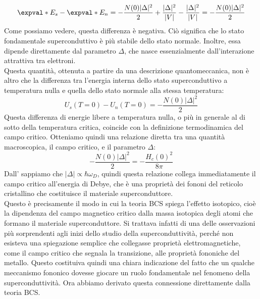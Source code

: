 \begin{equation*}
   \expval*{E}_s - \expval*{E}_n
   =
   -\frac{N(0)|\Delta|^2}{2}
   +
   \frac{|\Delta|^2}{|V|}
   -
   \frac{|\Delta|^2}{|V|}
   =
   -\frac{N(0)|\Delta|^2}{2}
\end{equation*}
Come possiamo vedere, questa differenza è negativa. Ciò significa che lo stato fondamentale superconduttivo è più stabile dello stato normale. Inoltre, essa dipende direttamente dal parametro $\Delta$, che nasce essenzialmente dall'interazione attrattiva tra elettroni.\\
Questa quantità, ottenuta a partire da una descrizione quantomeccanica, non è altro che la differenza tra l'energia interna dello stato superconduttivo a temperatura nulla e quella dello stato normale alla stessa temperatura:
\begin{equation*}
   U_s(T=0)-U_n(T=0)=-\frac{N(0)|\Delta|^2}{2}
\end{equation*}
Questa differenza di energie libere a temperatura nulla, o più in generale al di sotto della temperatura critica, coincide con la definizione termodinamica del campo critico. Otteniamo quindi una relazione diretta tra una quantità macroscopica, il campo critico, e il parametro $\Delta$:
\begin{equation*}
   -\frac{N(0)|\Delta|^2}{2}
   =
   -\frac{H_c(0)^2}{8\pi}
\end{equation*}
Dall' sappiamo che $|\Delta| \propto \hbar \omega_D$, quindi questa relazione collega immediatamente il campo critico all'energia di Debye, che è una proprietà dei fononi del reticolo cristallino che costituisce il materiale superconduttore.\\
Questo è precisamente il modo in cui la teoria BCS spiega l'effetto isotopico, cioè la dipendenza del campo magnetico critico dalla massa isotopica degli atomi che formano il materiale superconduttore. Si trattava infatti di una delle osservazioni più sorprendenti agli inizi dello studio della superconduttività, perché non esisteva una spiegazione semplice che collegasse proprietà elettromagnetiche, come il campo critico che segnala la transizione, alle proprietà fononiche del metallo. Questo costituiva quindi una chiara indicazione del fatto che un qualche meccanismo fononico dovesse giocare un ruolo fondamentale nel fenomeno della superconduttività. Ora abbiamo derivato questa connessione direttamente dalla teoria BCS.
